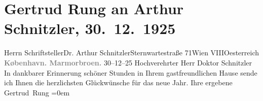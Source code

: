 

         
         \renewcommand{\erwaehntePersonen}{Personen: Georg Brandes}
         \renewcommand{\erwaehnteOrte}{Orte: Kopenhagen, Marmorbroen, Sternwartestraße, VIII., Josefstadt, Wien, Österreich}
         \renewcommand{\erwaehnteWerke}{}
               \section[Gertrud Rung an Arthur Schnitzler, 30. 12. 1925]{ Gertrud Rung an Arthur Schnitzler, 30. 12. 1925}\nopagebreak{}\rehead{ }\begin{ledgroupsized}[t]{13cm}\normalsize\beginnumbering \toendnotes[C]{\smallbreak\pagebreak[2]} 
\pstart{}{\pb}Herrn
                  Schriftsteller\pend{}\pstart{}Dr. Arthur Schnitzler\pend{}\pstart{}Sternwartestraße 71\pend{}\pstart{}Wien VIII\pend{}\pstart{}Oesterreich\pend{}{\bigskip}\pstart
           \noindent{}\centering{}\textcolor{gray}{\textbf{{\pb}København. Marmorbroen.}}\pend
           \pstart
           {\pb}30–12–25\pend
           \pstart{}Hochverehrter Herr Doktor Schnitzler\pend\pstart
           In dankbarer Erinnerung schöner Stunden in Ihrem gastfreundlichen Hause sende ich
               Ihnen die herzlichsten Glückwünsche für das neue Jahr.\pend
           \pstart
           Ihre ergebene{\\[\baselineskip]}\spacefill\mbox{Gertrud Rung}\pend
           \leftskip=0em{}
         
         \endnumbering{}\end{ledgroupsized}  \newcommand{\dateiname}{L02463}\newcommand{\titel}{Gertrud Rung an Arthur Schnitzler, 30. 12. 1925}\newcommand{\editorInnen}{Martin Anton Müller und Gerd-Hermann Susen}
      